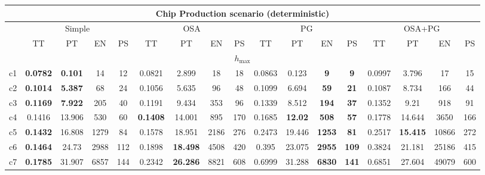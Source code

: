\begin{tabular}{||c||c|c|c|c||c|c|c|c||c|c|c|c||c|c|c|c||}%
\multicolumn{17}{c}{\textbf{Chip Production scenario (deterministic)}}\\%
\hline%
&\multicolumn{4}{|c|}{\small{Simple}}&\multicolumn{4}{|c|}{\small{OSA}}&\multicolumn{4}{|c|}{\small{PG}}&\multicolumn{4}{|c|}{\small{OSA+PG}}\\%
\hline%
&\small{TT}&\small{PT}&\small{EN}&\small{PS}&\small{TT}&\small{PT}&\small{EN}&\small{PS}&\small{TT}&\small{PT}&\small{EN}&\small{PS}&\small{TT}&\small{PT}&\small{EN}&\small{PS}\\%
\hline%
\multicolumn{17}{||c||}{$h_{\max}$}\\%
\hline%
c1&\small{\textbf{0.0782}}&\small{\textbf{0.101}}&\small{14}&\small{12}&\small{0.0821}&\small{2.899}&\small{18}&\small{18}&\small{0.0863}&\small{0.123}&\small{\textbf{9}}&\small{\textbf{9}}&\small{0.0997}&\small{3.796}&\small{17}&\small{15}\\%
\hline%
c2&\small{\textbf{0.1014}}&\small{\textbf{5.387}}&\small{68}&\small{24}&\small{0.1056}&\small{5.635}&\small{96}&\small{48}&\small{0.1099}&\small{6.694}&\small{\textbf{59}}&\small{\textbf{21}}&\small{0.1087}&\small{8.734}&\small{166}&\small{44}\\%
\hline%
c3&\small{\textbf{0.1169}}&\small{\textbf{7.922}}&\small{205}&\small{40}&\small{0.1191}&\small{9.434}&\small{353}&\small{96}&\small{0.1339}&\small{8.512}&\small{\textbf{194}}&\small{\textbf{37}}&\small{0.1352}&\small{9.21}&\small{918}&\small{91}\\%
\hline%
c4&\small{0.1416}&\small{13.906}&\small{530}&\small{60}&\small{\textbf{0.1408}}&\small{14.001}&\small{895}&\small{170}&\small{0.1685}&\small{\textbf{12.02}}&\small{\textbf{508}}&\small{\textbf{57}}&\small{0.1778}&\small{14.644}&\small{3650}&\small{166}\\%
\hline%
c5&\small{\textbf{0.1432}}&\small{16.808}&\small{1279}&\small{84}&\small{0.1578}&\small{18.951}&\small{2186}&\small{276}&\small{0.2473}&\small{19.446}&\small{\textbf{1253}}&\small{\textbf{81}}&\small{0.2517}&\small{\textbf{15.415}}&\small{10866}&\small{272}\\%
\hline%
c6&\small{\textbf{0.1464}}&\small{24.73}&\small{2988}&\small{112}&\small{0.1898}&\small{\textbf{18.498}}&\small{4508}&\small{420}&\small{0.395}&\small{23.075}&\small{\textbf{2955}}&\small{\textbf{109}}&\small{0.3824}&\small{21.181}&\small{25186}&\small{415}\\%
\hline%
c7&\small{\textbf{0.1785}}&\small{31.907}&\small{6857}&\small{144}&\small{0.2342}&\small{\textbf{26.286}}&\small{8821}&\small{608}&\small{0.6999}&\small{31.288}&\small{\textbf{6830}}&\small{\textbf{141}}&\small{0.6851}&\small{27.604}&\small{49079}&\small{600}\\%

\end{tabular}
